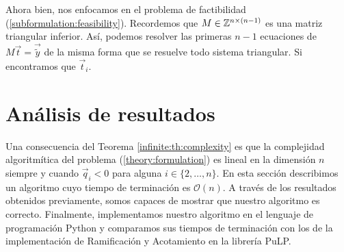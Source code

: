 Ahora bien, nos enfocamos en el problema de factibilidad (\ref{subformulation:feasibility}).
Recordemos que $M \in \mathbb{Z}^{n \times (n - 1)}$ es una matriz triangular inferior. Así, podemos
resolver las primeras $n - 1$ ecuaciones de $M\vec{t} = \vec{\tilde{y}}$ de la misma forma que se
resuelve todo sistema triangular. Si encontramos que $\vec{t}_i$.

\section{Análisis de resultados}
\noindent
Una consecuencia del Teorema \ref{infinite:th:complexity} es que la complejidad algoritmítica del
problema (\ref{theory:formulation}) es lineal en la dimensión $n$ siempre y cuando $\vec{q}_i < 0$
para alguna $i \in \lbrace 2, \ldots, n\rbrace$. En esta sección describimos un algoritmo cuyo
tiempo de terminación es $\mathcal{O}(n)$. A través de los resultados obtenidos previamente, somos
capaces de mostrar que nuestro algoritmo es correcto. Finalmente, implementamos nuestro algoritmo en
el lenguaje de programación Python y comparamos sus tiempos de terminación con los de la
implementación de Ramificación y Acotamiento en la librería PuLP. 
